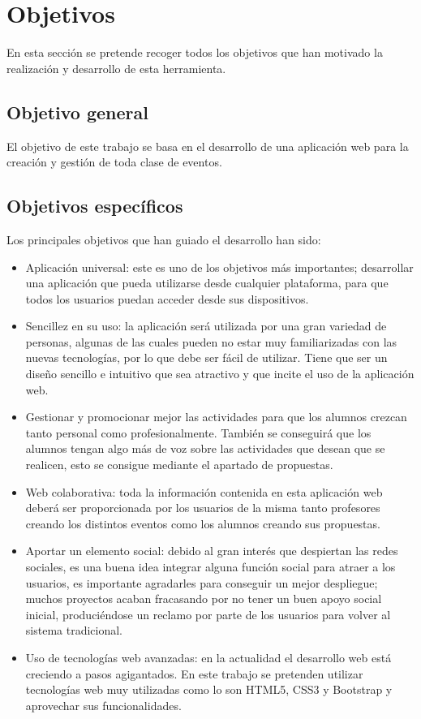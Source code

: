 \cleardoublepage
\chapter{Objetivos}
\label{chap:objetivos}

En esta sección se pretende recoger todos los objetivos que han motivado la realización y desarrollo de esta herramienta.


\section{Objetivo general}
\label{sec:objetivo-general}
El objetivo de este trabajo se basa en el desarrollo de una aplicación web para la creación y gestión de toda clase de eventos. 

\section{Objetivos específicos}
\label{sec:objetivos-especificos}

Los principales objetivos que han guiado el desarrollo han sido:
\begin{itemize}
\item Aplicación universal: este es uno de los objetivos más importantes;  desarrollar una aplicación que pueda utilizarse desde cualquier plataforma, para que todos los  usuarios puedan acceder desde sus dispositivos.
\item Sencillez en su uso: la aplicación será utilizada por una gran variedad de personas, algunas de las cuales pueden no estar muy familiarizadas con las nuevas tecnologías, por lo que debe ser fácil de utilizar. Tiene que ser un diseño sencillo e intuitivo que sea atractivo y que incite el uso de la aplicación web.
\item Gestionar y promocionar mejor las actividades para que los alumnos crezcan tanto personal como profesionalmente. También se conseguirá que los alumnos tengan algo más de voz sobre las actividades que desean que se realicen, esto se consigue mediante el apartado de propuestas.
\item Web colaborativa: toda la información contenida en esta aplicación web deberá ser proporcionada por los usuarios de la misma tanto profesores creando los distintos eventos como los alumnos creando sus propuestas.
\item Aportar un elemento social: debido al gran interés que despiertan las redes sociales, es una buena idea integrar alguna función social para atraer a los usuarios, es importante agradarles para conseguir un mejor despliegue; muchos proyectos acaban fracasando por no tener un buen apoyo social inicial, produciéndose un reclamo por parte de los usuarios para volver al sistema tradicional.
\item Uso de tecnologías web avanzadas: en la actualidad el desarrollo web está creciendo a pasos agigantados. En este trabajo se pretenden utilizar tecnologías web muy utilizadas como lo son HTML5, CSS3 y Bootstrap y aprovechar sus funcionalidades.
\end{itemize}